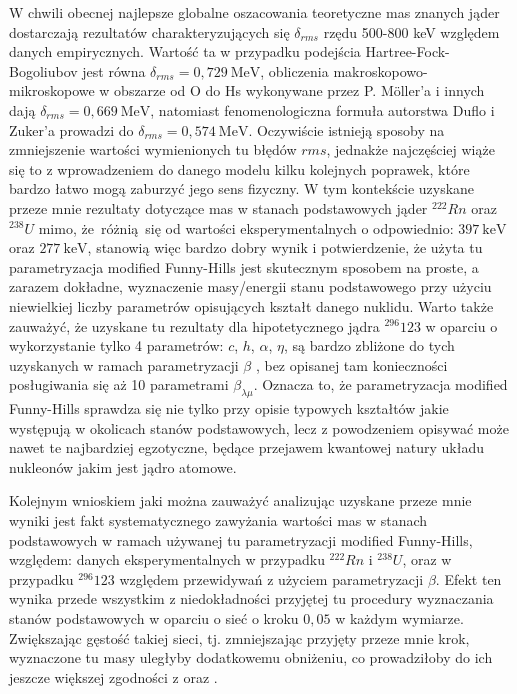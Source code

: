 \documentclass[a4paper,polish]{article}
\numberwithin{equation}{section}
\begin{document}
W chwili obecnej najlepsze globalne oszacowania teoretyczne mas znanych jąder dostarczają rezultatów charakteryzujących się $\delta_{rms}$ rzędu 500-800 keV względem danych empirycznych. Wartość ta w przypadku podejścia Hartree-Fock-Bogoliubov \cite{Gor1,Gor2} jest równa $\delta_{rms}=0,729~\mathrm{MeV}$, obliczenia makroskopowo-mikroskopowe w obszarze od O do Hs wykonywane przez P. M\"oller'a i innych \cite{Moll2009} dają  $\delta_{rms}=0,669~\mathrm{MeV}$, natomiast fenomenologiczna formuła autorstwa Duflo i Zuker'a \cite{Duflo} prowadzi do $\delta_{rms}=0,574~\mathrm{MeV}$. Oczywiście istnieją sposoby na zmniejszenie wartości wymienionych tu błędów $rms$, jednakże najczęściej wiąże się to z wprowadzeniem do danego modelu kilku kolejnych poprawek, które bardzo łatwo mogą zaburzyć jego sens fizyczny. W tym kontekście uzyskane przeze mnie rezultaty dotyczące mas w stanach podstawowych jąder $^{222}Rn$ oraz $^{238}U$ mimo, \mbox{że różnią się} od wartości eksperymentalnych o odpowiednio: $397~\mathrm{keV}$ oraz $277~\mathrm{keV}$, stanowią więc bardzo dobry wynik i potwierdzenie, że użyta tu parametryzacja modified Funny-Hills jest skutecznym sposobem na proste, a zarazem dokładne, wyznaczenie masy/energii stanu podstawowego przy użyciu niewielkiej liczby parametrów opisujących kształt danego nuklidu. Warto także zauważyć, że uzyskane tu rezultaty dla hipotetycznego jądra  $^{296}123$ w oparciu o wykorzystanie tylko 4 parametrów: $c$, $h$, $\alpha$, $\eta$, są bardzo zbliżone do tych uzyskanych w ramach parametryzacji $\beta$ \cite{A32}, bez opisanej tam konieczności posługiwania się aż 10 parametrami $\beta_{\lambda \mu}$. Oznacza to, że parametryzacja modified Funny-Hills sprawdza się nie tylko przy opisie typowych kształtów jakie występują w okolicach stanów podstawowych, lecz z powodzeniem opisywać może nawet te najbardziej egzotyczne, będące przejawem kwantowej natury układu nukleonów jakim jest jądro atomowe.

Kolejnym wnioskiem jaki można zauważyć analizując uzyskane przeze mnie wyniki jest fakt systematycznego zawyżania wartości mas w stanach podstawowych w ramach używanej tu parametryzacji modified Funny-Hills, względem: danych eksperymentalnych w przypadku $^{222}Rn$ i $^{238}U$, oraz w przypadku $^{296}123$ względem przewidywań z użyciem parametryzacji $\beta$. Efekt ten wynika przede wszystkim z niedokładności przyjętej tu procedury wyznaczania stanów podstawowych w oparciu o sieć o kroku $0,05$ w każdym wymiarze. Zwiększając gęstość takiej sieci, tj. zmniejszając przyjęty przeze mnie krok, wyznaczone tu masy uległyby dodatkowemu obniżeniu, co prowadziłoby do ich jeszcze większej zgodności z \cite{A32} oraz \cite{brookhaven}.
\end{document}
